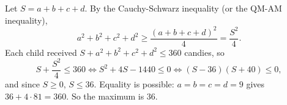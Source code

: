 Let $S=a+b+c+d$. By the Cauchy-Schwarz inequality (or the QM-AM inequality),
\[a^2+b^2+c^2+d^2\ge\dfrac{(a+b+c+d)^2}{4}=\dfrac{S^2}{4}.\]
Each child received $S+a^2+b^2+c^2+d^2\le360$ candies, so
\[S+\dfrac{S^2}{4}\le360\iff S^2+4S-1440\le0\iff(S-36)(S+40)\le0,\]
and since $S\ge0$, $S\le36$. Equality is possible: $a=b=c=d=9$ gives $36+4\cdot81=360$. So the maximum is $\boxed{36}$.
